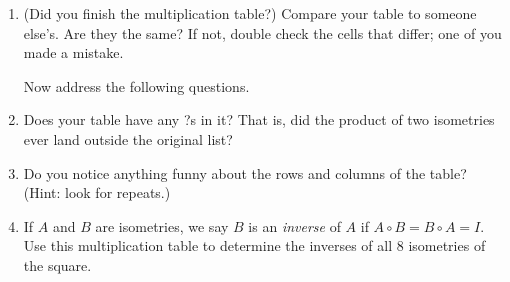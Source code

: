 \documentclass{article}
\begin{document}
\begin{enumerate}
\item (Did you finish the multiplication table?) Compare your table to someone else's. Are they the same? If not, double check the cells that differ; one of you made a mistake.

\vspace{1cm}

\noindent Now address the following questions.

\item Does your table have any ?s in it? That is, did the product of two isometries ever land outside the original list?

\vspace{3cm}

\item Do you notice anything funny about the rows and columns of the table? (Hint: look for repeats.)

\vspace{6cm}

\item If $A$ and $B$ are isometries, we say $B$ is an \emph{inverse} of $A$ if $A \circ B = B \circ A = I$. Use this multiplication table to determine the inverses of all 8 isometries of the square.

\end{enumerate}
\end{document}
